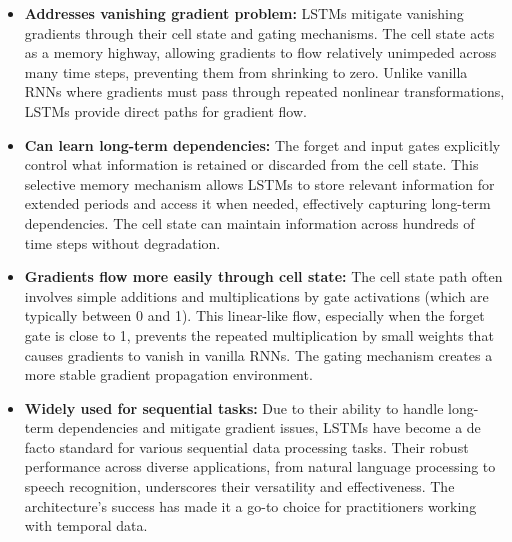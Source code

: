 \begin{itemize}
    \item \textbf{Addresses vanishing gradient problem:} LSTMs mitigate vanishing gradients through their cell state and gating mechanisms. The cell state acts as a memory highway, allowing gradients to flow relatively unimpeded across many time steps, preventing them from shrinking to zero. Unlike vanilla RNNs where gradients must pass through repeated nonlinear transformations, LSTMs provide direct paths for gradient flow.
    
    \item \textbf{Can learn long-term dependencies:} The forget and input gates explicitly control what information is retained or discarded from the cell state. This selective memory mechanism allows LSTMs to store relevant information for extended periods and access it when needed, effectively capturing long-term dependencies. The cell state can maintain information across hundreds of time steps without degradation.
    
    \item \textbf{Gradients flow more easily through cell state:} The cell state path often involves simple additions and multiplications by gate activations (which are typically between 0 and 1). This linear-like flow, especially when the forget gate is close to 1, prevents the repeated multiplication by small weights that causes gradients to vanish in vanilla RNNs. The gating mechanism creates a more stable gradient propagation environment.
    
    \item \textbf{Widely used for sequential tasks:} Due to their ability to handle long-term dependencies and mitigate gradient issues, LSTMs have become a de facto standard for various sequential data processing tasks. Their robust performance across diverse applications, from natural language processing to speech recognition, underscores their versatility and effectiveness. The architecture's success has made it a go-to choice for practitioners working with temporal data.
\end{itemize}

